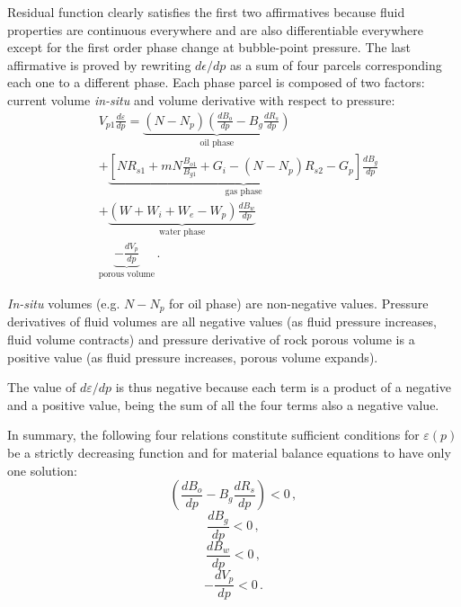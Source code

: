 \documentclass[authoryear,preprint,review,12pt]{elsarticle}
\begin{document}
Residual function clearly satisfies the first two affirmatives because fluid properties are continuous everywhere and are also differentiable everywhere except for the first order phase change at bubble-point pressure.
The last affirmative is proved by rewriting $d\epsilon/dp$ as a sum of four parcels corresponding each one to a different phase. Each phase parcel is composed of two factors: current volume \textit{in-situ} and volume derivative with respect to pressure:
\begin{equation}
\begin{split}
&V_{p1}\frac{d\varepsilon}{dp}=\underbrace{\left(N-N_p\right) \left(\frac{dB_o}{dp} - B_g \frac{dR_s}{dp} \right)}_\text{oil phase}\\
&+\underbrace{\left[N R_{s1}+mN\frac{B_{o1}}{B_{g1}}+G_i-\left(N-N_p\right)R_{s2}-G_p\right] \frac{dB_g}{dp}}_\text{gas phase}\\
&+\underbrace{\left(W + W_i+W_e-W_p\right)\frac{dB_w}{dp}}_\text{water phase}\\
&\underbrace{-\frac{dV_p}{dp}}_\text{porous volume}\, .
\end{split}
\end{equation}

\textit{In-situ} volumes (e.g. $N-N_p$ for oil phase) are non-negative values. Pressure derivatives of fluid volumes are all negative values (as fluid pressure increases, fluid volume contracts) and pressure derivative of rock porous volume is a positive value (as fluid pressure increases, porous volume expands).

The value of $d\varepsilon/dp$ is thus negative because each term is a product of a negative and a positive value, being the sum of all the four terms also a negative value.

In summary, the following four relations constitute sufficient conditions for $\varepsilon(p)$ be a strictly decreasing function and for material balance equations to have only one solution:
\begin{equation}\label{eq: PVTH1}
\left(\frac{dB_o}{dp} - B_g \frac{dR_s}{dp} \right) <0 \, ,
\end{equation}
\begin{equation}\label{eq: PVTH2}
\frac{dB_g}{dp} < 0 \, ,
\end{equation}
\begin{equation}\label{eq: PVTH3}
\frac{dB_w}{dp} < 0 \, ,
\end{equation}
\begin{equation}\label{eq: PVTH4}
-\frac{dV_p}{dp}<0 \, .
\end{equation}
\end{document}
